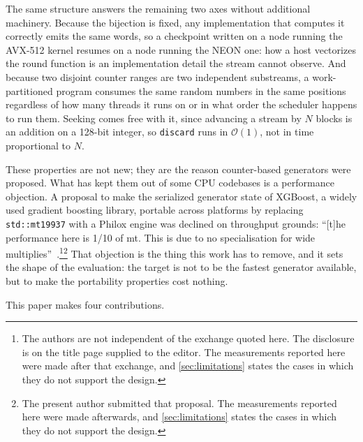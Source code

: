 \documentclass[acmsmall,screen,review]{acmart}
\makeatletter
\theoremstyle{acmdefinition}
\newcommand{\bigO}[1]{\mathcal{O}\!\left(#1\right)}
\newcommand{\code}[1]{\texttt{#1}}
\newcommand{\ifanon}[2]{\if@ACM@anonymous#1\else#2\fi}
\makeatother
\begin{document}
The same structure answers the remaining two axes without additional
machinery. Because the bijection is fixed, any implementation that computes it
correctly emits the same words, so a checkpoint written on a node running the
AVX-512 kernel resumes on a node running the NEON one: how a host vectorizes
the round function is an implementation detail the stream cannot observe. And
because two disjoint counter ranges are two independent substreams, a
work-partitioned program consumes the same random numbers in the same positions
regardless of how many threads it runs on or in what order the scheduler
happens to run them. Seeking comes free with it, since advancing a stream by
$N$ blocks is an addition on a 128-bit integer, so \code{discard} runs in
$\bigO{1}$, not in time proportional to $N$.

These properties are not new; they are the reason counter-based generators were
proposed. What has kept them out of some CPU codebases is a performance
objection. A proposal to make the serialized generator state of XGBoost, a
widely used gradient boosting library, portable across platforms by replacing
\code{std::mt19937} with a Philox engine was declined on throughput grounds:
``[t]he performance here is 1/10 of mt. This is due to no specialisation for
wide multiplies''~\cite{xgboostrng}.\ifanon{\footnote{The authors are not independent of
the exchange quoted here. The disclosure is on the title page supplied to the
editor. The measurements reported here were made after that exchange, and
\cref{sec:limitations} states the cases in which they do not support the
design.}}{\footnote{The present author submitted that
proposal. The measurements reported here were made afterwards, and
\cref{sec:limitations} states the cases in which they do not support the
design.}} That objection is the thing this work has to remove, and it sets the
shape of the evaluation: the target is not to be the fastest generator
available, but to make the portability properties cost nothing.

This paper makes four contributions.
\end{document}
